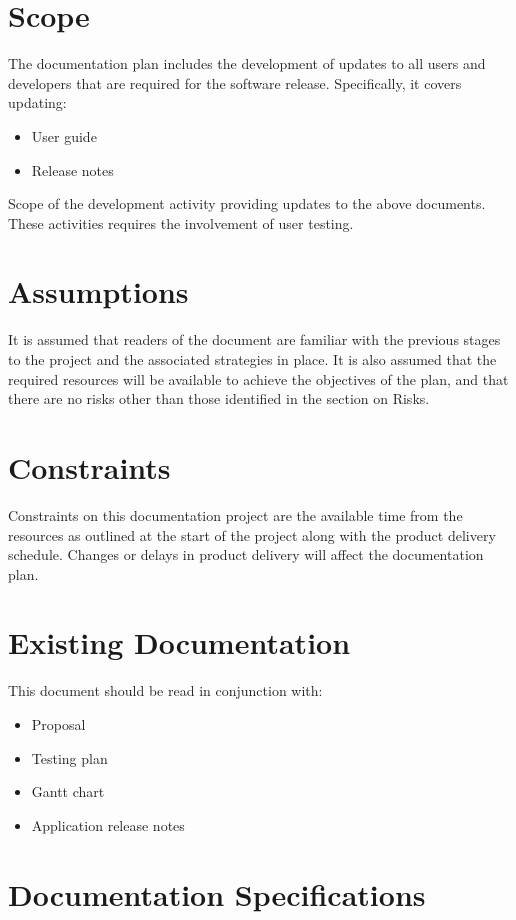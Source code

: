 \documentclass[12pt]{article}
\begin{document}
\section{Scope}
The documentation plan includes the development of updates to all users and developers that are required for the software release. Specifically, it covers updating:
\begin{itemize}
	\item User guide
	\item Release notes
\end{itemize}

Scope of the development activity providing updates to the above documents. These activities requires the involvement of user testing. 

\section{Assumptions}
It is assumed that readers of the document are familiar with the previous stages to the project and the associated strategies in place. It is also assumed that the required resources will be available to achieve the objectives of the plan, and that there are no risks other than those identified in the section on Risks.

\section{Constraints}
Constraints on this documentation project are the available time from the resources as outlined at the start of the project along with the product delivery schedule. Changes or delays in product delivery will affect the documentation plan.

\section{Existing Documentation}
This document should be read in conjunction with:
\begin{itemize}
    \item Proposal
    \item Testing plan
    \item Gantt chart
    \item Application release notes
\end{itemize}

\section{Documentation Specifications}
\end{document}
